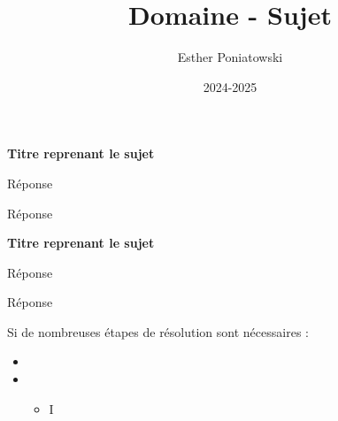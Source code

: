 \documentclass[10pt,a4paper]{article}
\title{Domaine - Sujet}
\author{Esther Poniatowski}
\date{2024-2025}
\begin{document}
\textbf{Titre reprenant le sujet}

\q Réponse

\q Réponse

\bigskip
\textbf{Titre reprenant le sujet}

\q Réponse

\q Réponse

Si de nombreuses étapes de résolution sont nécessaires :
\begin{itemize}
    \item

    \item
    \begin{itemize}
        \item I
    \end{itemize}
\end{itemize}
\end{document}
